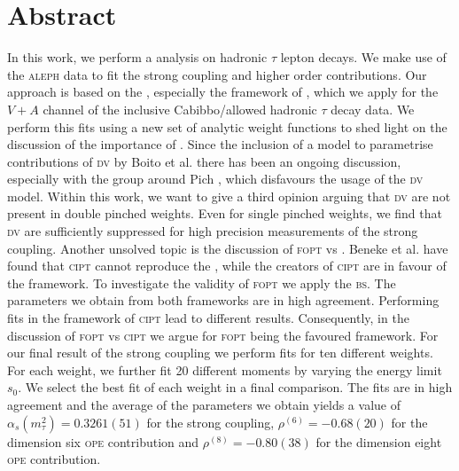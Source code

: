\documentclass[../../index.tex]{subfiles}
\begin{document}
\chapter*{Abstract}
In this work, we perform a  analysis on
hadronic \(\tau\) lepton decays. We make use of the \textsc{aleph} data to fit
the strong coupling and higher order 
contributions. Our approach is based on the , especially the framework of , which we apply for the \(V+A\) channel of the inclusive
Cabibbo\-/allowed hadronic \(\tau\) decay data. We perform this fits using a new
set of analytic weight functions to shed light on the discussion of the
importance of . Since the inclusion of a model to
parametrise contributions of \textsc{dv} by Boito et al. \cite{2011a} there has
been an ongoing discussion, especially with the group around Pich
\cite{Pich2016}, which disfavours the usage of the \textsc{dv} model. Within
this work, we want to give a third opinion arguing that \textsc{dv} are not
present in double pinched weights. Even for single pinched weights, we find that
\textsc{dv} are sufficiently suppressed for high precision measurements of the
strong coupling. Another unsolved topic is the discussion of \textsc{fopt} vs
. Beneke et al.
\cite{Beneke2008} have found that \textsc{cipt} cannot reproduce the
, while the creators of \textsc{cipt}
\cite{Pivovarov1991, LeDiberder1992a} are in favour of the framework. To
investigate the validity of \textsc{fopt} we apply the \textsc{bs}. The
parameters we obtain from both frameworks are in high agreement. Performing fits
in the framework of \textsc{cipt} lead to different results. Consequently, in
the discussion of \textsc{fopt} vs \textsc{cipt} we argue for \textsc{fopt}
being the favoured framework. For our final result of the strong coupling we
perform fits for ten different weights. For each weight, we further fit 20
different moments by varying the energy limit \(s_0\). We select the best fit of
each weight in a final comparison. The fits are in high agreement and the
average of the parameters we obtain yields a value of \(\alpha_s(m_\tau^2) =
0.3261(51) \) for the strong coupling, \(\rho^{(6)} = -0.68(20)\) for the
dimension six \textsc{ope} contribution and \(\rho^{(8)} = -0.80(38) \) for the
dimension eight \textsc{ope} contribution.
\end{document}
